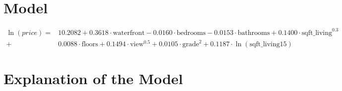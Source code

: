 \documentclass[12pt]{article}
\begin{document}
	\nopagebreak
\section*{Model}
\begin{align*}
	\ln(price) =& 10.2082 + 0.3618\cdot \text{waterfront} - 0.0160\cdot\text{bedrooms} -0.0153 \cdot\text{bathrooms} +0.1400\cdot\text{sqft\_living}^{0.3} \\ +& 0.0088 \cdot \text{floors}
	+ 0.1494\cdot\text{view}^{0.5}+ 0.0105\cdot\text{grade}^2+0.1187\cdot\ln\left(\text{sqft\_living15}\right)
\end{align*}
\section*{Explanation of the Model}
\end{document}
